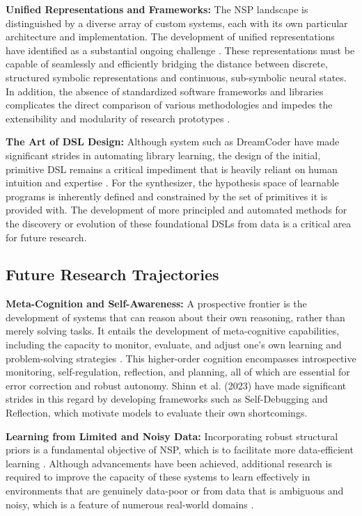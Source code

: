 \documentclass[12pt, a4paper]{report}
\begin{document}
\textbf{Unified Representations and Frameworks:} The NSP landscape is distinguished by a diverse array of custom systems, each with its own particular architecture and implementation. The development of unified representations have identified as a substantial ongoing challenge \citep{garnelo2021survey}. These representations must be capable of seamlessly and efficiently bridging the distance between discrete, structured symbolic representations and continuous, sub-symbolic neural states. In addition, the absence of standardized software frameworks and libraries complicates the direct comparison of various methodologies and impedes the extensibility and modularity of research prototypes \citep{chaudhuri2021neurosymbolic}.

\textbf{The Art of DSL Design:} Although system such as DreamCoder have made significant strides in automating library learning, the design of the initial, primitive DSL remains a critical impediment that is heavily reliant on human intuition and expertise \citep{knoth2023type}. For the synthesizer, the hypothesis space of learnable programs is inherently defined and constrained by the set of primitives it is provided with.
The development of more principled and automated methods for the discovery or evolution of these foundational DSLs from data is a critical area for future research.

\subsection{Future Research Trajectories}
\textbf{Meta-Cognition and Self-Awareness:} A prospective frontier is the development of systems that can reason about their own reasoning, rather than merely solving tasks. It entails the development of meta-cognitive capabilities, including the capacity to monitor, evaluate, and adjust one's own learning and problem-solving strategies \citep{crosby2020metacognitive}. This higher-order cognition encompasses introspective monitoring, self-regulation, reflection, and planning, all of which are essential for error correction and robust autonomy. Shinn et al. (2023) \citep{shinn2023reflexion} have made significant strides in this regard by developing frameworks such as Self-Debugging and Reflection, which motivate models to evaluate their own shortcomings.

\textbf{Learning from Limited and Noisy Data:} Incorporating robust structural priors is a fundamental objective of NSP, which is to facilitate more data-efficient learning \citep{chaudhuri2021neurosymbolic}. Although advancements have been achieved, additional research is required to improve the capacity of these systems to learn effectively in environments that are genuinely data-poor or from data that is ambiguous and noisy, which is a feature of numerous real-world domains \citep{devlin2017robustfill}.
\end{document}
